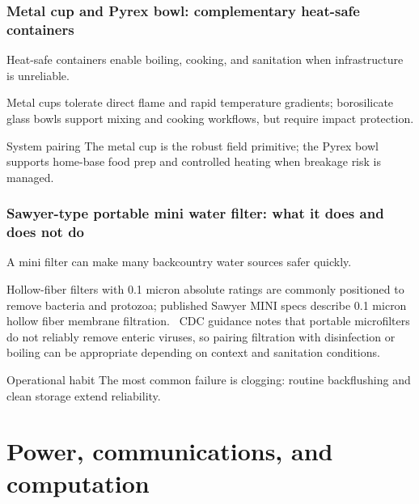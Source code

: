 \begin{frame}[t]
  \frametitle{Metal cup and Pyrex bowl: complementary heat-safe containers}
  \justifying
   Heat-safe containers enable boiling, cooking, and sanitation when infrastructure is unreliable.

  \vspace{0.5em}
   Metal cups tolerate direct flame and rapid temperature gradients; borosilicate glass bowls support mixing and cooking workflows, but require impact protection.

  \vspace{0.8em}
  \begin{block}{System pairing}
    The metal cup is the robust field primitive; the Pyrex bowl supports home-base food prep and controlled heating when breakage risk is managed.
  \end{block}
\end{frame}

\begin{frame}[t,shrink=2]
  \frametitle{Sawyer-type portable mini water filter: what it does and does not do}
  \justifying
   A mini filter can make many backcountry water sources safer quickly.

  \vspace{0.5em}
   Hollow-fiber filters with 0.1 micron absolute ratings are commonly positioned to remove bacteria and protozoa; published Sawyer MINI specs describe 0.1 micron hollow fiber membrane filtration.~\cite{sawyer_mini_specs,sawyer_eu_specs} CDC guidance notes that portable microfilters do not reliably remove enteric viruses, so pairing filtration with disinfection or boiling can be appropriate depending on context and sanitation conditions.~\cite{cdc_yellowbook_filters_viruses,cdc_backcountry}

  \vspace{0.8em}
  \begin{block}{Operational habit}
    The most common failure is clogging: routine backflushing and clean storage extend reliability.
  \end{block}
\end{frame}

\section{Power, communications, and computation}

